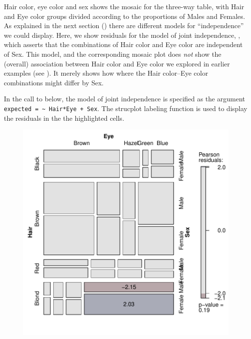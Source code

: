 \documentclass[11pt]{book}
\renewenvironment{knitrout}{\small\renewcommand{\baselinestretch}{.85}}{} %
\begin{document}
\begin{Example}[HEC1]{Hair color, eye color and sex}
 shows the mosaic for the three-way table, with Hair and Eye color
groups divided according to the proportions of Males and Females.
As explained in the next section ()
there are different models for
``independence'' we could display.  Here, we show residuals for
the model of joint independence, , which 
asserts that the combinations of Hair color and Eye color are
independent of Sex.  This model, and the corresponding mosaic
plot does \emph{not} show the (overall) association between Hair color
and Eye color we explored in earlier examples (see ).  It merely shows how where the Hair color--Eye color
combinations might differ by Sex.

In the call to  below, the model of joint independence
is specified as the argument \verb|expected = ~ Hair*Eye + Sex|.
The strucplot labeling function 
is used to display the residuals in the the highlighted cells.
\begin{knitrout}
\color{fgcolor}\begin{kframe}
\begin{alltt}
 \hlkwb{<-} \hlstd{HairEyeColor[,} \hlstd{(}\hlstd{,} \hlstd{,} \hlstd{,} \hlstd{),]}
  \hlstd{=} \hlopt{~} \hlopt{*} \hlopt{+} 
        \hlstd{=}\hlstd{)}
\end{alltt}
\end{kframe}\begin{figure}[!htb]


\centerline{\includegraphics[width=.7\textwidth]{ch05/fig/HEC-mos1} }


\end{figure}
\end{knitrout}
\end{Example}
\end{document}
